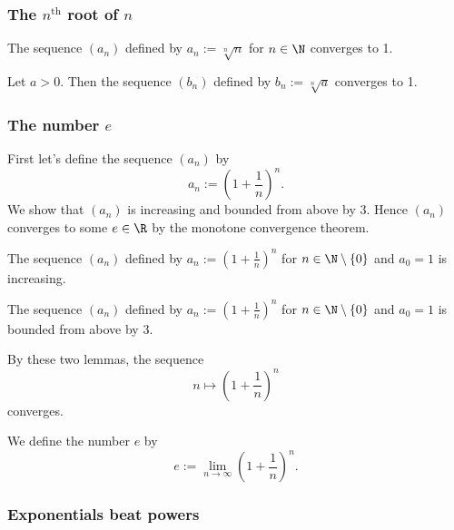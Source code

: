 \subsubsection{The $n^{\text{th}}$ root of $n$}
\begin{proposition}
    The sequence $(a_n)$ defined by $a_n := \sqrt[n]{n}$ for $n \in \N$ converges to 1.
\end{proposition}

\begin{corollary}
    Let $a > 0$. Then the sequence $(b_n)$ defined by $b_n := \sqrt[n]{a}$ converges to 1.
\end{corollary}

\subsubsection{The number $e$}
First let's define the sequence $(a_n)$ by
$$a_n := \left(1 + \frac{1}{n}\right)^n.$$
We show that $(a_n)$ is increasing and bounded from above by $3$. Hence $(a_n)$ converges to some $e \in \R$ by the monotone convergence theorem.
\begin{lemma}
    The sequence $(a_n)$ defined by $a_n := \left(1 + \frac{1}{n}\right)^n$ for $n \in \N \setminus \{0\}$ and $a_0 = 1$ is increasing.
\end{lemma}

\begin{lemma}
    The sequence $(a_n)$ defined by $a_n := \left(1 + \frac{1}{n}\right)^n$ for $n \in \N \setminus \{0\}$ and $a_0 = 1$ is bounded from above by 3.
\end{lemma}

By these two lemmas, the sequence
$$n \mapsto \left(1 + \frac{1}{n}\right)^n$$
converges.

\begin{definition}
    We define the number $e$ by
    $$e := \lim_{n\to\infty}\left(1 + \frac{1}{n}\right)^n.$$
\end{definition}

\subsubsection{Exponentials beat powers}
